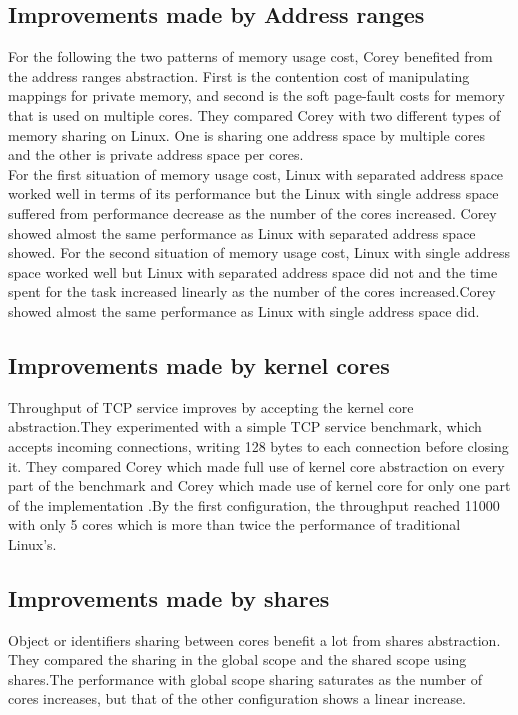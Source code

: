 \documentclass[10pt,a4paper]{ltjsarticle}       %
\begin{document}
\subsection{Improvements made by Address ranges}
For the following the two patterns of memory usage cost, Corey benefited from the address ranges abstraction. First is the contention cost of manipulating mappings for private memory, and second is the soft page-fault costs for memory that is used on multiple cores. They compared Corey with two different types of memory sharing on Linux. One is sharing one address space by multiple cores and the other is private address space per cores.\\
For the first situation of memory usage cost, Linux with separated address space worked well in terms of its performance but the Linux with single address space suffered from performance decrease as the number of the cores increased. Corey showed almost the same performance as Linux with separated address space showed.
For the second situation of memory usage cost, Linux with single address space worked well but Linux with separated address space did not and the time spent for the task increased linearly as the number of the cores increased.Corey showed almost the same performance as Linux with single address space did.
\subsection{Improvements made by kernel cores}
Throughput of TCP service improves by accepting the kernel core abstraction.They experimented with a simple TCP service benchmark, which accepts incoming connections, writing 128 bytes to each connection before closing it. They compared Corey which made full use of kernel core abstraction on every part of the benchmark and Corey which made use of kernel core for only one part of the implementation
.By the first configuration, the throughput reached 11000 with only 5 cores which is more than twice the performance of traditional Linux's.
\subsection{Improvements made by shares}
Object or identifiers sharing between cores benefit a lot from shares abstraction. They compared the sharing in the global scope and the shared scope using shares.The performance with global scope sharing saturates as the number of cores increases, but that of the other configuration shows a linear increase.
\end{document}
